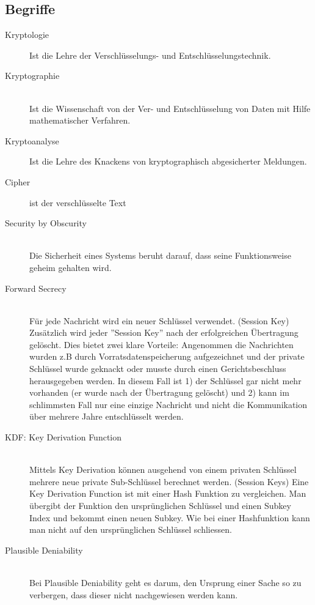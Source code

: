\subsection{Begriffe}
\begin{description}
	\item[Kryptologie] Ist die Lehre der Verschlüsselungs- und Entschlüsselungstechnik.
	\item[Kryptographie] \hfill \\ Ist die Wissenschaft von der Ver- und Entschlüsselung von Daten mit Hilfe mathematischer Verfahren.
	\item[Kryptoanalyse] Ist die Lehre des Knackens von kryptographisch abgesicherter Meldungen.
	\item[Cipher] ist der verschlüsselte Text
	\item[Security by Obscurity] \hfill \\
	Die Sicherheit eines Systems beruht darauf, dass seine Funktionsweise geheim gehalten wird.
	\item[Forward Secrecy] \hfill \\
	Für jede Nachricht wird ein neuer Schlüssel verwendet. (Session Key) Zusätzlich wird jeder ''Session Key'' nach der erfolgreichen Übertragung gelöscht. Dies bietet zwei klare Vorteile: Angenommen die Nachrichten wurden z.B durch Vorratsdatenspeicherung aufgezeichnet und der private Schlüssel wurde geknackt oder musste durch einen Gerichtsbeschluss herausgegeben werden. In diesem Fall ist 1) der Schlüssel gar nicht mehr vorhanden (er wurde nach der Übertragung gelöscht) und 2) kann im schlimmsten Fall nur eine einzige Nachricht und nicht die Kommunikation über mehrere Jahre entschlüsselt werden.
	\item[KDF: Key Derivation Function] \hfill \\
	Mittels Key Derivation können ausgehend von einem privaten Schlüssel mehrere neue private Sub-Schlüssel berechnet werden. (Session Keys) Eine Key Derivation Function ist mit einer Hash Funktion zu vergleichen. Man übergibt der Funktion den ursprünglichen Schlüssel und einen Subkey Index und bekommt einen neuen Subkey. Wie bei einer Hashfunktion kann man nicht auf den ursprünglichen Schlüssel schliessen.
	\item[Plausible Deniability] \hfill \\
	Bei Plausible Deniability geht es darum, den Ursprung einer Sache so zu verbergen, dass dieser nicht nachgewiesen werden kann.
\end{description}

